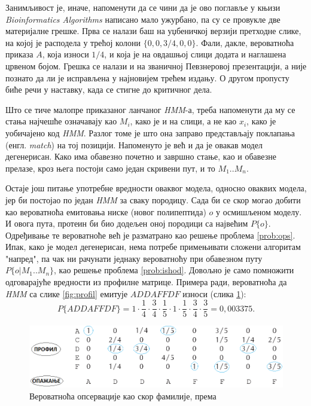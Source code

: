 \documentclass[12pt,oneside]{memoir}
\begin{document}
\begin{CJK}{UTF8}{ipxm}
Занимљивост је, иначе, напоменути да се чини да је ово поглавље у књизи \textit{Bioinformatics Algorithms} написано мало ужурбано, па су се провукле две материјалне грешке. Прва се налази баш на уџбеничкој верзији претходне слике, на којој је расподела у трећој колони $\{0, 0, 3/4, 0, 0\}$. Фали, дакле, вероватноћа приказа $A$, која износи $1/4$, и која је на овдашњој слици додата и наглашена црвеном бојом. Грешка се налази и на званичној Певзнеровој презентацији, а није познато да ли је исправљена у најновијем трећем издању. О другом пропусту биће речи у наставку, када се стигне до критичног дела.

Што се тиче малопре приказаног ланчаног \textit{HMM}-а, треба напоменути да му се стања најчешће означавају као $M_i$, како је и на слици, а не као $x_i$, како је уобичајено код \textit{HMM}. Разлог томе је што она заправо представљају поклапања (енгл. \textit{match}) на тој позицији. Напоменуто је већ и да је овакав модел дегенерисан. Како има обавезно почетно и завршно стање, као и обавезне прелазе, кроз њега постоји само један скривени пут, и то $M_1..M_n$.

Остаје још питање употребне вредности оваквог модела, односно оваквих модела, јер би постојао по један \textit{HMM} за сваку породицу. Сада би се скор могао добити као вероватноћа емитовања ниске (новог полипептида) $o$ у осмишљеном моделу. И овога пута, протеин би био додељен оној породици са највећим $P\{o\}$. Одређивање те вероватноће већ је разматрано као решење проблема \ref{prob:ops}. Ипак, како је модел дегенерисан, нема потребе примењивати сложени алгоритам "напред", па чак ни рачунати једнаку вероватноћу при обавезном путу $P\{o | M_1..M_n\}$, као решење проблема \ref{prob:ishod}. Довољно је само помножити одговарајуће вредности из профилне матрице. Примера ради, вероватноћа да \textit{HMM} са слике \ref{fig:profil} емитује $ADDAFFDF$ износи (слика \ref{fig:prof_ishod}): $$P\{ADDAFFDF\} = 1 \cdot \frac{1}{4} \cdot \frac{3}{4} \cdot \frac{1}{5} \cdot 1 \cdot \frac{1}{5} \cdot \frac{3}{4} \cdot \frac{3}{5} = 0,003375.$$

\begin{figure}[!ht]
  \centering
  \includegraphics[width=\textwidth]{prof_ishod.png}
  \caption{Вероватноћа опсервације као скор фамилије, према \cite{compeau2015}}
  \label{fig:prof_ishod}
\end{figure}


\end{CJK}
\end{document}
